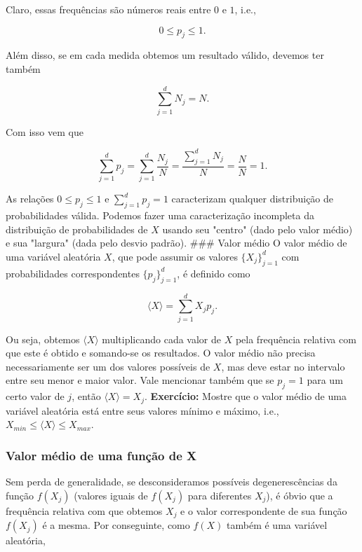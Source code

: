 \documentclass[11pt]{article}
\begin{document}
Claro, essas frequências são números reais entre \(0\) e \(1\), i.e.,

\begin{equation}
0 \le p_{j} \le 1.
\end{equation}

Além disso, se em cada medida obtemos um resultado válido, devemos ter
também

\begin{equation}
\sum_{j=1}^{d} N_{j} = N.
\end{equation}

Com isso vem que

\begin{equation}
\sum_{j=1}^{d} p_{j} = \sum_{j=1}^{d} \frac{N_{j}}{N} = \frac{\sum_{j=1}^{d} N_{j}}{N} = \frac{N}{N} = 1.
\end{equation}

As relações \(0 \le p_{j} \le 1\) e \(\sum_{j=1}^{d} p_{j} = 1\)
caracterizam qualquer distribuição de probabilidades válida. Podemos
fazer uma caracterização incompleta da distribuição de probabilidades de
\(X\) usando seu "centro" (dado pelo valor médio) e sua "largura" (dada
pelo desvio padrão). \#\#\# Valor médio O valor médio de uma variável
aleatória \(X\), que pode assumir os valores \(\{X_{j}\}_{j=1}^{d}\) com
probabilidades correspondentes \(\{p_{j}\}_{j=1}^{d}\), é definido como

\begin{equation}
\langle X \rangle = \sum_{j=1}^{d} X_{j}p_{j}.
\end{equation}

Ou seja, obtemos \(\langle X\rangle\) multiplicando cada valor de \(X\)
pela frequência relativa com que este é obtido e somando-se os
resultados. O valor médio não precisa necessariamente ser um dos valores
possíveis de \(X\), mas deve estar no intervalo entre seu menor e maior
valor. Vale mencionar também que se \(p_{j} = 1\) para um certo valor de
\(j\), então \(\langle X \rangle = X_{j}\). \textbf{Exercício:} Mostre
que o valor médio de uma variável aleatória está entre seus valores
mínimo e máximo, i.e., \(X_{min}\le \langle X\rangle\le X_{max}\).

\subsubsection{Valor médio de uma função de
X}\label{valor-muxe9dio-de-uma-funuxe7uxe3o-de-x}

Sem perda de generalidade, se desconsideramos possíveis degenerescências
da função \(f(X_{j})\) (valores iguais de \(f(X_{j})\) para diferentes
\(X_{j}\)), é óbvio que a frequência relativa com que obtemos \(X_{j}\)
e o valor correspondente de sua função \(f(X_{j})\) é a mesma. Por
conseguinte, como \(f(X)\) também é uma variável aleatória,
\end{document}
